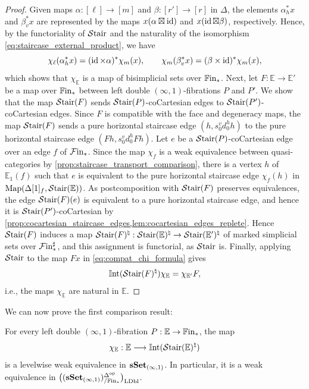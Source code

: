 \documentclass[10pt,reqno]{amsart}
\begin{document}
\begin{proof}
Given maps $\alpha:[\ell]\to[m]$ and $\beta:[r']\to[r]$ in
$\Delta$, the elements $\alpha_h^*x$ and $\beta_v^*x$ are
represented by the maps $x(\alpha\boxtimes\operatorname{id})$ and
$x(\operatorname{id}\boxtimes\beta)$, respectively. Hence, by the functoriality of
$\mathcal{S}\mathrm{tair}$ and the naturality of the isomorphism
\eqref{eq:staircase_external_product}, we have
\[
 \chi_\ell(\alpha_h^*x)=(\operatorname{id}\times\alpha)^*\chi_m(x),
 \qquad
 \chi_m(\beta_v^*x)=(\beta\times\operatorname{id})^*\chi_m(x),
\]
which shows that $\chi_{\mathbb E}$ is a map of bisimplicial sets
over $\mathbb{F}\mathrm{in}_*$. Next, let $F:\mathbb E\to\mathbb E'$ be a map
over $\mathbb{F}\mathrm{in}_*$ between left double $(\infty,1)$-fibrations $P$
and $P'$. We show that the map $\mathcal{S}\mathrm{tair}(F)$ sends
$\mathcal{S}\mathrm{tair}(P)$-coCartesian edges to $\mathcal{S}\mathrm{tair}(P')$-coCartesian edges.
Since $F$ is compatible with the face and degeneracy maps, the map
$\mathcal{S}\mathrm{tair}(F)$ sends a pure horizontal staircase edge
$(h,s_0^v d_0^h h)$ to the pure horizontal staircase edge
$(Fh,s_0^v d_0^h Fh)$. Let $e$ be a $\mathcal{S}\mathrm{tair}(P)$-coCartesian edge
over an edge $f$ of $\mathcal{F}\mathrm{in}_*$. Since the map $\chi_f$ is a weak
equivalence between quasi-categories by
\cref{prop:staircase_transport_comparison}, there is a vertex $h$ of
$\mathbb E_1(f)$ such that $e$ is equivalent to the pure horizontal
staircase edge $\chi_f(h)$ in
$\operatorname{Map}(\Delta[1]_f,\mathcal{S}\mathrm{tair}(\mathbb E))$. As postcomposition with
$\mathcal{S}\mathrm{tair}(F)$ preserves equivalences, the edge $\mathcal{S}\mathrm{tair}(F)(e)$ is
equivalent to a pure horizontal staircase edge, and hence it is
$\mathcal{S}\mathrm{tair}(P')$-coCartesian by
\cref{prop:cocartesian_staircase_edges,lem:cocartesian_edges_replete}.
Hence $\mathcal{S}\mathrm{tair}(F)$ induces a map
$\mathcal{S}\mathrm{tair}(F)^\natural:\mathcal{S}\mathrm{tair}(\mathbb E)^\natural\to
\mathcal{S}\mathrm{tair}(\mathbb E')^\natural$ of marked simplicial sets over
$\mathcal{F}\mathrm{in}_*^\sharp$, and this assignment is functorial, as $\mathcal{S}\mathrm{tair}$
is. Finally, applying $\mathcal{S}\mathrm{tair}$ to the map $Fx$ in
\eqref{eq:compat_chi_formula} gives
\[
 \mathbb{I}\mathrm{nt}(\mathcal{S}\mathrm{tair}(F)^\natural)\chi_{\mathbb E}
 =\chi_{\mathbb E'}F,
\]
i.e., the maps $\chi_{\mathbb E}$ are natural in $\mathbb E$.
\end{proof}

We can now prove the first comparison result:

\begin{theorem}
\label{thm:first_roundtrip_comparison}
For every left double $(\infty,1)$-fibration
$P:\mathbb E\to\mathbb{F}\mathrm{in}_*$, the map
\[
\chi_{\mathbb E}:\mathbb E\longrightarrow
\mathbb{I}\mathrm{nt}(\mathcal{S}\mathrm{tair}(\mathbb E)^\natural)
\]
is a levelwise weak equivalence in $\mathbf{sSet}_{(\infty,1)}$. In
particular, it is a weak equivalence in $\bigl((\mathbf{sSet}_{(\infty,1)})^{\Delta^{\mathrm{op}}}_{/\mathbb{F}\mathrm{in}_*}\bigr)_{\mathrm{LDbl}}$.
\end{theorem}
\end{document}
